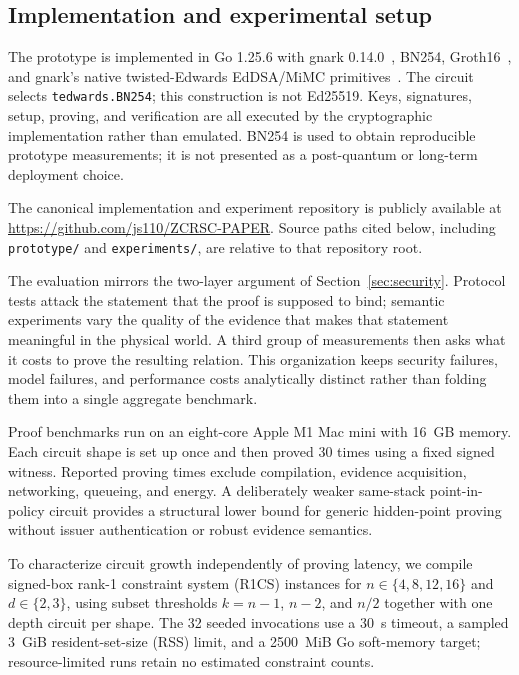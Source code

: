 \documentclass[preprint,review,12pt]{elsarticle}
\begin{document}
\subsection{Implementation and experimental setup}
The prototype is implemented in Go 1.25.6 with gnark 0.14.0~\cite{gnark}, BN254, Groth16~\cite{Groth2016}, and gnark's native twisted-Edwards EdDSA/MiMC primitives~\cite{MiMC2016}. The circuit selects \texttt{tedwards.BN254}; this construction is not Ed25519. Keys, signatures, setup, proving, and verification are all executed by the cryptographic implementation rather than emulated. BN254 is used to obtain reproducible prototype measurements; it is not presented as a post-quantum or long-term deployment choice.

The canonical implementation and experiment repository is publicly available at \url{https://github.com/js110/ZCRSC-PAPER}. Source paths cited below, including \texttt{prototype/} and \texttt{experiments/}, are relative to that repository root.

The evaluation mirrors the two-layer argument of Section~\ref{sec:security}. Protocol tests attack the statement that the proof is supposed to bind; semantic experiments vary the quality of the evidence that makes that statement meaningful in the physical world. A third group of measurements then asks what it costs to prove the resulting relation. This organization keeps security failures, model failures, and performance costs analytically distinct rather than folding them into a single aggregate benchmark.

Proof benchmarks run on an eight-core Apple M1 Mac mini with 16~GB memory. Each circuit shape is set up once and then proved 30 times using a fixed signed witness. Reported proving times exclude compilation, evidence acquisition, networking, queueing, and energy. A deliberately weaker same-stack point-in-policy circuit provides a structural lower bound for generic hidden-point proving without issuer authentication or robust evidence semantics.

To characterize circuit growth independently of proving latency, we compile signed-box rank-1 constraint system (R1CS) instances for $n\in\{4,8,12,16\}$ and $d\in\{2,3\}$, using subset thresholds $k=n-1$, $n-2$, and $n/2$ together with one depth circuit per shape. The 32 seeded invocations use a 30~s timeout, a sampled 3~GiB resident-set-size (RSS) limit, and a 2500~MiB Go soft-memory target; resource-limited runs retain no estimated constraint counts.
\end{document}
